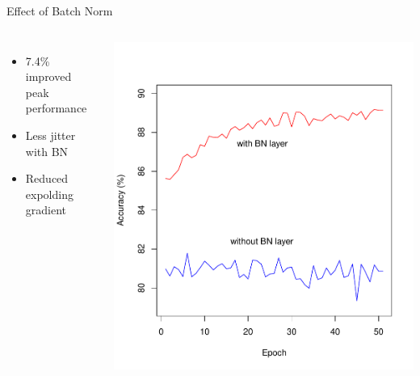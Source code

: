 \documentclass[aspectratio=1610, 12pt]{beamer}
\begin{document}
\begin{frame}{Effect of Batch Norm}
	\begin{columns}
		\begin{itemize}
			\item 7.4\% improved peak performance
			\item Less jitter with BN
			\item Reduced expolding gradient
		\end{itemize}

		\centering
		\includegraphics[scale=0.45]{images/batchnorm_measurement.pdf}
	\end{columns}
\end{frame}
\end{document}

